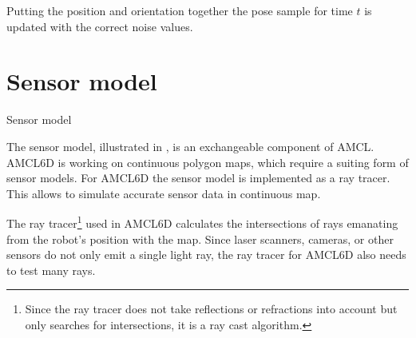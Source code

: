 \documentclass[Thesis.tex]{subfiles}
\begin{document}
Putting the position and orientation together the pose sample for time $t$ is updated with the correct noise values.
%
%
%
%
%
%
\section{Sensor model}
%
\begin{algorithm}[!htp]
\caption{Sensor model}
\label{alg:sensormodel}

\end{algorithm}
%
The sensor model, illustrated in , is an exchangeable component of \gls{AMCL}. \gls{AMCL6D} is working on continuous polygon maps, which require a suiting form of sensor models. For \gls{AMCL6D} the sensor model is implemented as a ray tracer. This allows to simulate accurate sensor data in continuous map. 

The ray tracer\footnote{Since the ray tracer does not take reflections or refractions into account but only searches for intersections, it is a ray cast algorithm.} used in \gls{AMCL6D} calculates the intersections of rays emanating from the robot's position with the map. Since laser scanners, cameras, or other sensors do not only emit a single light ray, the ray tracer for \gls{AMCL6D} also needs to test many rays. 
\end{document}
